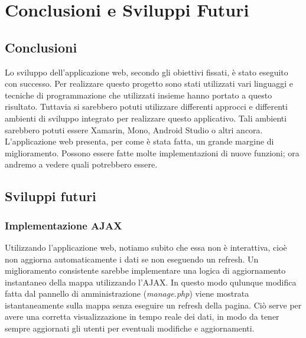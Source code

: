 \chapter{Conclusioni e Sviluppi Futuri}

\section{Conclusioni}
Lo sviluppo dell'applicazione web, secondo gli obiettivi fissati, è stato eseguito con successo. Per realizzare questo progetto sono stati utilizzati vari linguaggi e tecniche di programmazione che utilizzati insieme hanno portato a questo risultato. Tuttavia si sarebbero potuti utilizzare differenti approcci e differenti ambienti di sviluppo integrato per realizzare questo applicativo. Tali ambienti sarebbero potuti essere Xamarin, Mono, Android Studio o altri ancora.
\newline
L'applicazione web presenta, per come è stata fatta, un grande margine di miglioramento. Possono essere fatte molte implementazioni di nuove funzioni; ora andremo a vedere quali potrebbero essere.
\section{Sviluppi futuri}
\subsection{Implementazione AJAX}
Utilizzando l'applicazione web, notiamo subito che essa non è interattiva, cioè non aggiorna automaticamente i dati se non eseguendo un refresh. Un miglioramento consistente sarebbe implementare una logica di aggiornamento instantaneo della mappa utilizzando l'AJAX. In questo modo qulunque modifica fatta dal pannello di amministrazione (\textit{manage.php}) viene mostrata istantaneamente sulla mappa senza eseguire un refresh della pagina. \newline Ciò serve per avere una corretta visualizzazione in tempo reale dei dati, in modo da tener sempre aggiornati gli utenti per eventuali modifiche e aggiornamenti.
